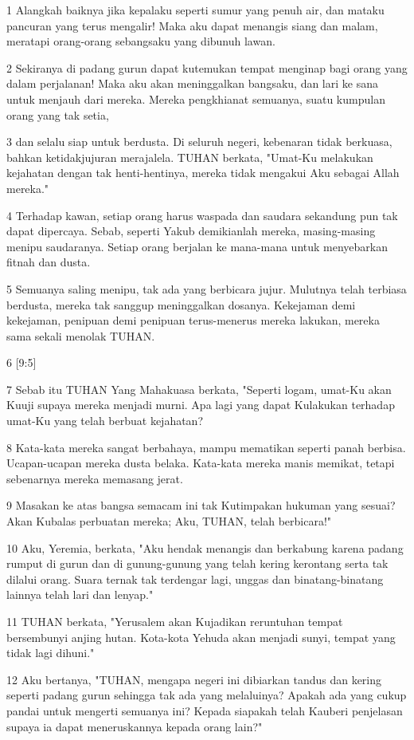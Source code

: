 \par 1 Alangkah baiknya jika kepalaku seperti sumur yang penuh air, dan mataku pancuran yang terus mengalir! Maka aku dapat menangis siang dan malam, meratapi orang-orang sebangsaku yang dibunuh lawan.
\par 2 Sekiranya di padang gurun dapat kutemukan tempat menginap bagi orang yang dalam perjalanan! Maka aku akan meninggalkan bangsaku, dan lari ke sana untuk menjauh dari mereka. Mereka pengkhianat semuanya, suatu kumpulan orang yang tak setia,
\par 3 dan selalu siap untuk berdusta. Di seluruh negeri, kebenaran tidak berkuasa, bahkan ketidakjujuran merajalela. TUHAN berkata, "Umat-Ku melakukan kejahatan dengan tak henti-hentinya, mereka tidak mengakui Aku sebagai Allah mereka."
\par 4 Terhadap kawan, setiap orang harus waspada dan saudara sekandung pun tak dapat dipercaya. Sebab, seperti Yakub demikianlah mereka, masing-masing menipu saudaranya. Setiap orang berjalan ke mana-mana untuk menyebarkan fitnah dan dusta.
\par 5 Semuanya saling menipu, tak ada yang berbicara jujur. Mulutnya telah terbiasa berdusta, mereka tak sanggup meninggalkan dosanya. Kekejaman demi kekejaman, penipuan demi penipuan terus-menerus mereka lakukan, mereka sama sekali menolak TUHAN.
\par 6 [9:5]
\par 7 Sebab itu TUHAN Yang Mahakuasa berkata, "Seperti logam, umat-Ku akan Kuuji supaya mereka menjadi murni. Apa lagi yang dapat Kulakukan terhadap umat-Ku yang telah berbuat kejahatan?
\par 8 Kata-kata mereka sangat berbahaya, mampu mematikan seperti panah berbisa. Ucapan-ucapan mereka dusta belaka. Kata-kata mereka manis memikat, tetapi sebenarnya mereka memasang jerat.
\par 9 Masakan ke atas bangsa semacam ini tak Kutimpakan hukuman yang sesuai? Akan Kubalas perbuatan mereka; Aku, TUHAN, telah berbicara!"
\par 10 Aku, Yeremia, berkata, "Aku hendak menangis dan berkabung karena padang rumput di gurun dan di gunung-gunung yang telah kering kerontang serta tak dilalui orang. Suara ternak tak terdengar lagi, unggas dan binatang-binatang lainnya telah lari dan lenyap."
\par 11 TUHAN berkata, "Yerusalem akan Kujadikan reruntuhan tempat bersembunyi anjing hutan. Kota-kota Yehuda akan menjadi sunyi, tempat yang tidak lagi dihuni."
\par 12 Aku bertanya, "TUHAN, mengapa negeri ini dibiarkan tandus dan kering seperti padang gurun sehingga tak ada yang melaluinya? Apakah ada yang cukup pandai untuk mengerti semuanya ini? Kepada siapakah telah Kauberi penjelasan supaya ia dapat meneruskannya kepada orang lain?"
